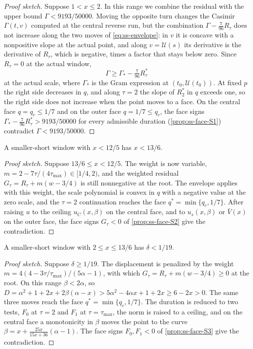 \begin{proof}[Proof sketch]
Suppose $1<x\le2$. In this range we combine the residual with the upper bound $\Gamma<9193/50000$. Moving the opposite turn changes the Casimir $\Gamma(t,v)$ computed at
the central reverse run, but the combination $\Gamma-\frac{7}{96}R_\tau$ does not increase along
the two moves of \eqref{eq:ss-envelope}: in $v$ it is concave with a nonpositive slope at the
actual point, and along $v=\mathcal U(s)$ its derivative is the derivative of $R_\tau$, which is
negative, times a factor that stays below zero. Since $R_\tau=0$ at the actual window,
\[
  \Gamma\ge\Gamma_*-\tfrac{7}{96}R^*_\tau
\]
at the actual scale, where $\Gamma_*$ is the Gram expression at
$(t_0,\mathcal U(t_0))$. At fixed $p$ the right side decreases in $q$, and along $\tau=2$ the slope
of $R^*_2$ in $q$ exceeds one, so the right side does not increase when the point moves to a face.
On the central face $q=q_c\le1/7$ and on the outer face $q=1/7\le q_c$, the face signs
$\Gamma_*-\frac{7}{96}R^*_\tau>9193/50000$ for every admissible duration
(\cref{prop:ss-face-S1}) contradict $\Gamma<9193/50000$.
\end{proof}

\begin{proposition}[Gate S2]\label{prop:ss-S2}
A smaller-short window with $x<12/5$ has $x<13/6$.
\end{proposition}

\begin{proof}[Proof sketch]
Suppose $13/6\le x<12/5$. The weight is now variable, $m=2-7\tau/(4\tau_{\max})\in[1/4,2)$, and
the weighted residual $G_\tau=R_\tau+m(w-3/4)$ is still nonnegative at the root. The envelope
applies with this weight, the scale polynomial is convex in $q$ with a negative value at the zero
scale, and the $\tau=2$ continuation reaches the face $q^*=\min\{q_c,1/7\}$. After raising $u$ to
the ceiling $u_C(x,\beta)$ on the central face, and to $u_s(x,\beta)$ or $\bar V(x)$ on the outer
face, the face signs $G_\tau<0$ of \cref{prop:ss-face-S2} give the contradiction.
\end{proof}

\begin{proposition}[Gate S3]\label{prop:ss-S3}
A smaller-short window with $2\le x\le13/6$ has $\delta<1/19$.
\end{proposition}

\begin{proof}[Proof sketch]
Suppose $\delta\ge1/19$. The displacement is penalized by the weight
$m=4(4-3\tau/\tau_{\max})/(5\alpha-1)$, with which $G_\tau=R_\tau+m(w-3/4)\ge0$ at the root. On
this range $\beta<2\alpha$, so $D=\alpha^2+1+2x+2\beta(\alpha-x)>5\alpha^2-4\alpha x+1+2x\ge
6-2x>0$. The same three moves reach the face $q^*=\min\{q_c,1/7\}$. The duration is reduced to two
tests, $F_0$ at $\tau=2$ and $F_1$ at $\tau=\tau_{\max}$, the norm is raised to a ceiling, and on
the central face a monotonicity in $\beta$ moves the point to the curve
$\beta=x+\frac{25x}{15x+36}(\alpha-1)$. The face signs $F_0,F_1<0$ of
\cref{prop:ss-face-S3} give the contradiction.
\end{proof}

